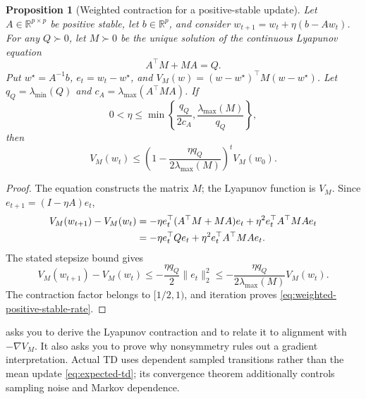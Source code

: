 \documentclass[11pt,twoside]{article}
\newcommand{\R}{\mathbb R}
\newtheorem{proposition}[theorem]{Proposition}
\theoremstyle{definition}
\theoremstyle{remark}
\begin{document}
\begin{proposition}[Weighted contraction for a positive-stable update]
\label{prop:weighted-positive-stable}
Let $A\in\R^{p\times p}$ be positive stable, let $b\in\R^p$, and consider
$w_{t+1}=w_t+\eta(b-Aw_t)$. For any $Q\succ0$, let $M\succ0$ be the unique
solution of the continuous \emph{Lyapunov equation}
\begin{equation}
 A^\top M+MA=Q.
 \label{eq:lyapunov-equation}
\end{equation}
Put $w^\star=A^{-1}b$, $e_t=w_t-w^\star$, and
$V_M(w)=(w-w^\star)^\top M(w-w^\star)$. Let
$q_Q=\lambda_{\min}(Q)$ and
$c_A=\lambda_{\max}(A^\top MA)$. If
\[
 0<\eta\le
 \min\left\{\frac{q_Q}{2c_A},
             \frac{\lambda_{\max}(M)}{q_Q}\right\},
\]
then
\begin{equation}
 V_M(w_t)
 \le\left(1-\frac{\eta q_Q}{2\lambda_{\max}(M)}\right)^tV_M(w_0).
 \label{eq:weighted-positive-stable-rate}
\end{equation}
\end{proposition}

\begin{proof}
The equation constructs the matrix $M$; the Lyapunov function is $V_M$.
Since $e_{t+1}=(I-\eta A)e_t$,
\begin{align}
 V_M(w_{t+1})-V_M(w_t)
 &=-\eta e_t^\top(A^\top M+MA)e_t
   +\eta^2e_t^\top A^\top MAe_t\notag\\
 &=-\eta e_t^\top Qe_t
   +\eta^2e_t^\top A^\top MAe_t.
 \label{eq:td-lyapunov-decrease}
\end{align}
The stated stepsize bound gives
\[
 V_M(w_{t+1})-V_M(w_t)
 \le-\frac{\eta q_Q}{2}\|e_t\|_2^2
 \le-\frac{\eta q_Q}{2\lambda_{\max}(M)}V_M(w_t).
\]
The contraction factor belongs to $[1/2,1)$, and iteration proves
\cref{eq:weighted-positive-stable-rate}.
\end{proof}

 asks you to derive the Lyapunov contraction and to
relate it to alignment with $-\nabla V_M$. It also asks you to prove why
nonsymmetry rules out a gradient interpretation.
Actual TD uses dependent sampled transitions rather than the mean update
\cref{eq:expected-td}; its convergence theorem additionally controls sampling
noise and Markov dependence.
\end{document}
